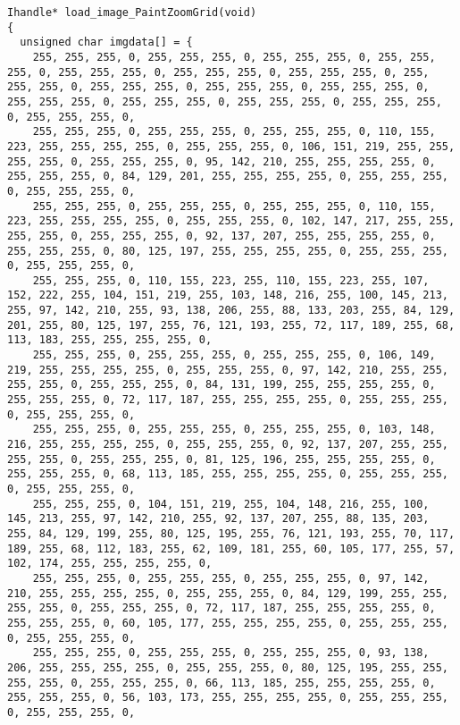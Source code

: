 \documentclass{ctexart}
\begin{document}
\begin{lstlisting}
Ihandle* load_image_PaintZoomGrid(void)
{
  unsigned char imgdata[] = {
    255, 255, 255, 0, 255, 255, 255, 0, 255, 255, 255, 0, 255, 255, 255, 0, 255, 255, 255, 0, 255, 255, 255, 0, 255, 255, 255, 0, 255, 255, 255, 0, 255, 255, 255, 0, 255, 255, 255, 0, 255, 255, 255, 0, 255, 255, 255, 0, 255, 255, 255, 0, 255, 255, 255, 0, 255, 255, 255, 0, 255, 255, 255, 0,
    255, 255, 255, 0, 255, 255, 255, 0, 255, 255, 255, 0, 110, 155, 223, 255, 255, 255, 255, 0, 255, 255, 255, 0, 106, 151, 219, 255, 255, 255, 255, 0, 255, 255, 255, 0, 95, 142, 210, 255, 255, 255, 255, 0, 255, 255, 255, 0, 84, 129, 201, 255, 255, 255, 255, 0, 255, 255, 255, 0, 255, 255, 255, 0,
    255, 255, 255, 0, 255, 255, 255, 0, 255, 255, 255, 0, 110, 155, 223, 255, 255, 255, 255, 0, 255, 255, 255, 0, 102, 147, 217, 255, 255, 255, 255, 0, 255, 255, 255, 0, 92, 137, 207, 255, 255, 255, 255, 0, 255, 255, 255, 0, 80, 125, 197, 255, 255, 255, 255, 0, 255, 255, 255, 0, 255, 255, 255, 0,
    255, 255, 255, 0, 110, 155, 223, 255, 110, 155, 223, 255, 107, 152, 222, 255, 104, 151, 219, 255, 103, 148, 216, 255, 100, 145, 213, 255, 97, 142, 210, 255, 93, 138, 206, 255, 88, 133, 203, 255, 84, 129, 201, 255, 80, 125, 197, 255, 76, 121, 193, 255, 72, 117, 189, 255, 68, 113, 183, 255, 255, 255, 255, 0,
    255, 255, 255, 0, 255, 255, 255, 0, 255, 255, 255, 0, 106, 149, 219, 255, 255, 255, 255, 0, 255, 255, 255, 0, 97, 142, 210, 255, 255, 255, 255, 0, 255, 255, 255, 0, 84, 131, 199, 255, 255, 255, 255, 0, 255, 255, 255, 0, 72, 117, 187, 255, 255, 255, 255, 0, 255, 255, 255, 0, 255, 255, 255, 0,
    255, 255, 255, 0, 255, 255, 255, 0, 255, 255, 255, 0, 103, 148, 216, 255, 255, 255, 255, 0, 255, 255, 255, 0, 92, 137, 207, 255, 255, 255, 255, 0, 255, 255, 255, 0, 81, 125, 196, 255, 255, 255, 255, 0, 255, 255, 255, 0, 68, 113, 185, 255, 255, 255, 255, 0, 255, 255, 255, 0, 255, 255, 255, 0,
    255, 255, 255, 0, 104, 151, 219, 255, 104, 148, 216, 255, 100, 145, 213, 255, 97, 142, 210, 255, 92, 137, 207, 255, 88, 135, 203, 255, 84, 129, 199, 255, 80, 125, 195, 255, 76, 121, 193, 255, 70, 117, 189, 255, 68, 112, 183, 255, 62, 109, 181, 255, 60, 105, 177, 255, 57, 102, 174, 255, 255, 255, 255, 0,
    255, 255, 255, 0, 255, 255, 255, 0, 255, 255, 255, 0, 97, 142, 210, 255, 255, 255, 255, 0, 255, 255, 255, 0, 84, 129, 199, 255, 255, 255, 255, 0, 255, 255, 255, 0, 72, 117, 187, 255, 255, 255, 255, 0, 255, 255, 255, 0, 60, 105, 177, 255, 255, 255, 255, 0, 255, 255, 255, 0, 255, 255, 255, 0,
    255, 255, 255, 0, 255, 255, 255, 0, 255, 255, 255, 0, 93, 138, 206, 255, 255, 255, 255, 0, 255, 255, 255, 0, 80, 125, 195, 255, 255, 255, 255, 0, 255, 255, 255, 0, 66, 113, 185, 255, 255, 255, 255, 0, 255, 255, 255, 0, 56, 103, 173, 255, 255, 255, 255, 0, 255, 255, 255, 0, 255, 255, 255, 0,

\end{lstlisting}
\end{document}
